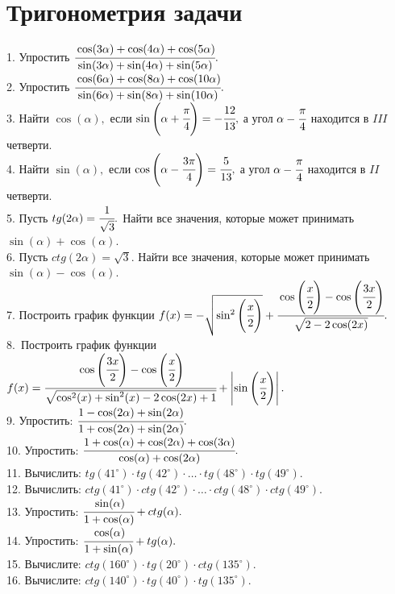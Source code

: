 \documentclass[12pt]{article}
\begin{document}
\section{Тригонометрия задачи}
1. Упростить $\cfrac{\cos(3\alpha)+\cos(4\alpha)+\cos(5\alpha)}{\sin(3\alpha)+\sin(4\alpha)+\sin(5\alpha)}.$\\
2. Упростить $\cfrac{\cos(6\alpha)+\cos(8\alpha)+\cos(10\alpha)}{\sin(6\alpha)+\sin(8\alpha)+\sin(10\alpha)}.$\\
3. Найти $\cos(\alpha),$ если $\sin\left(\alpha+\cfrac{\pi}{4}\right)=-\cfrac{12}{13},$ а угол $\alpha-\cfrac{\pi}{4}$ находится в $III$ четверти.\\
4. Найти $\sin(\alpha),$ если $\cos\left(\alpha-\cfrac{3\pi}{4}\right)=\cfrac{5}{13},$ а угол $\alpha-\cfrac{\pi}{4}$ находится в $II$ четверти.\\
5. Пусть $tg(2\alpha)=\cfrac{1}{\sqrt{3}}.$ Найти все значения, которые может принимать $\sin(\alpha)+\cos(\alpha).$\\
6. Пусть $ctg(2\alpha)=\sqrt{3}.$ Найти все значения, которые может принимать $\sin(\alpha)-\cos(\alpha).$\\
7. Построить график функции $f(x)=-\sqrt{\sin^2\left(\cfrac{x}{2}\right)}+\cfrac{\cos\left(\cfrac{x}{2}\right)-\cos\left(\cfrac{3x}{2}\right)}
{\sqrt{2-2\cos(2x)}}.$\\
8.\ Построить график функции $f(x)=\cfrac{\cos\left(\cfrac{3x}{2}\right)-\cos\left(\cfrac{x}{2}\right)}
{\sqrt{\cos^2(x)+\sin^2(x)-2\cos(2x)+1}}+\left|\sin\left(\cfrac{x}{2}\right)\right|.$\\
9. Упростить: $\cfrac{1-\cos(2\alpha)+\sin(2\alpha)}{1+\cos(2\alpha)+\sin(2\alpha)}.$\\
10. Упростить: $\cfrac{1+\cos(\alpha)+\cos(2\alpha)+\cos(3\alpha)}{\cos(\alpha)+\cos(2\alpha)}.$\\
11. Вычислить: $tg(41^\circ)\cdot tg(42^\circ)\cdot \ldots \cdot tg(48^\circ)\cdot tg(49^\circ).$\\
12. Вычислить: $ctg(41^\circ)\cdot ctg(42^\circ)\cdot \ldots \cdot ctg(48^\circ)\cdot ctg(49^\circ).$\\
13. Упростить: $\cfrac{\sin(\alpha)}{1+\cos(\alpha)}+ctg(\alpha).$\\
14. Упростить: $\cfrac{\cos(\alpha)}{1+\sin(\alpha)}+tg(\alpha).$\\
15. Вычислите: $ctg(160^\circ)\cdot tg(20^\circ)\cdot ctg(135^\circ).$\\
16. Вычислите: $ctg(140^\circ)\cdot tg(40^\circ)\cdot tg(135^\circ).$\\
\end{document}
